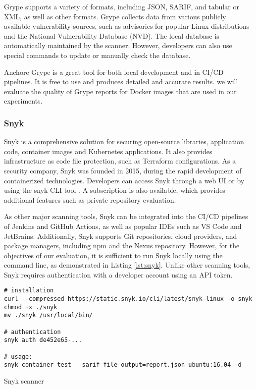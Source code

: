 Grype supports a variety of formats, including JSON, SARIF, and tabular or XML, as well as other formats. Grype collects data from various publicly available vulnerability sources, such as advisories for popular Linux distributions and the National Vulnerability Database (NVD). The local database is automatically maintained by the scanner. However, developers can also use special commands to update or manually check the database.

Anchore Grype is a great tool for both local development and in CI/CD pipelines. It is free to use and produces detailed and accurate results. we will evaluate the quality of Grype reports for Docker images that are used in our experiments.


\subsubsection{Snyk}

Snyk is a comprehensive solution for securing open-source libraries, application code, container images and Kubernetes applications. It also provides infrastructure as code file protection, such as Terraform configurations. As a security company, Snyk was founded in 2015, during the rapid development of containerized technologies. Developers can access Snyk through a web UI or by using the snyk CLI tool \cite{gh:snyk}. A subscription is also available, which provides additional features such as private repository evaluation.


As other major scanning tools, Snyk can be integrated into the CI/CD pipelines of Jenkins and GitHub Actions, as well as popular IDEs such as VS Code and JetBrains. Additionally, Snyk supports Git repositories, cloud providers, and package managers, including npm and the Nexus repository. However, for the objectives of our evaluation, it is sufficient to run Snyk locally using the command line, as demonstrated in Listing \ref{lst:snyk}. Unlike other scanning tools, Snyk requires authentication with a developer account using an API token.

\begin{listing}[htp]
    \centering
    \begin{minipage}{0.9\linewidth}
        \begin{verbatim}
# installation
curl --compressed https://static.snyk.io/cli/latest/snyk-linux -o snyk
chmod +x ./snyk
mv ./snyk /usr/local/bin/

# authentication
snyk auth de452e65-...

# usage:
snyk container test --sarif-file-output=report.json ubuntu:16.04 -d
        \end{verbatim}
    \end{minipage}
    \caption{Snyk scanner}
    \label{lst:snyk}
\end{listing}


